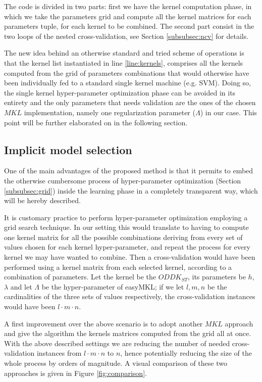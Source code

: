 The code is divided in two parts: first we have the kernel computation phase,
in which we take the parameters grid and compute all the kernel matrices for each
parameters tuple, for each kernel to be combined.
The second part consist in the two loops of the nested cross-validation, see
Section \ref{subsubsec:ncv} for details.

The new idea behind an otherwise standard and tried scheme of operations is that
the kernel list instantiated in line \ref{line:kernels}, comprises all the 
kernels computed from the grid of parameters combinations that would otherwise
have been individually fed to a standard single kernel machine (e.g. SVM).
Doing so, the single kernel hyper-parameter optimization phase can be avoided in its
entirety and the only parameters that needs validation are the ones of the chosen
$MKL$ implementation, namely one regularization parameter ($\Lambda$) in our case.
This point will be further elaborated on in the following section.

\subsection{Implicit model selection}
\label{subsec:parameters}
One of the main advantages of the proposed method is that it permits to embed
the otherwise cumbersome process of hyper-parameter optimization (Section \ref{subsubsec:grid})
inside the learning phase in a completely transparent way, which will be hereby
described.

It is customary practice to perform hyper-parameter optimization employing a grid
search technique.
In our setting this would translate to having to compute one kernel matrix
for all the possible combinations deriving from every set of values
chosen for each kernel hyper-parameter, and repeat the process for every kernel 
we may have wanted to combine.
Then a cross-validation would have been performed using a kernel matrix from each
selected kernel, according to a combination of parameters.
Let the kernel be the $ODDK_{ST}$, its parameters be $h$, $\lambda$ and let $\Lambda$
be the hyper-parameter of easyMKL; if we let $l,m,n$ be the cardinalities of the three
sets of values respectively, the cross-validation instances would have been $l\cdot m\cdot n$.

A first improvement over the above scenario is to adopt another $MKL$ approach 
and give the algorithm the kernels matrices computed from the grid all at once.
With the above described settings we are reducing the number of needed
cross-validation instances from $l\cdot m\cdot n$ to $n$, hence potentially
reducing the size of the whole process by orders of magnitude.
A visual comparison of these two approaches is given in Figure \ref{fig:comparison}.

